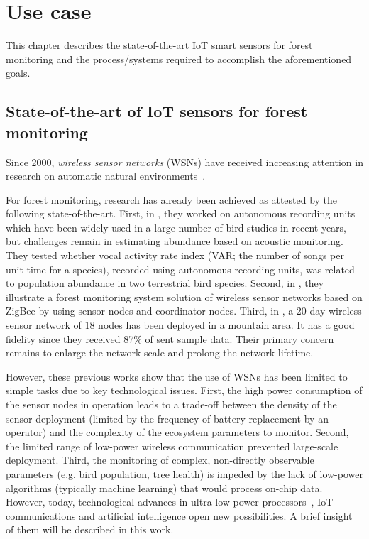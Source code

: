 \documentclass{EPL-master-thesis-covers-EN}
\begin{document}
\chapter{Use case}

This chapter describes the state-of-the-art IoT smart sensors for forest monitoring and the process/systems required to accomplish the aforementioned goals.

\section{State-of-the-art of IoT sensors for forest monitoring}

Since 2000, \textit{wireless sensor networks} (WSNs) have received increasing attention in research on automatic natural environments~\cite{Akyildiz}. 

For forest monitoring, research has already been achieved as attested by the following state-of-the-art. First, in \cite{Granados}, they worked on autonomous recording units which have been widely used in a large number of bird studies in recent years, but challenges remain in estimating abundance based on acoustic monitoring. They tested whether vocal activity rate index (VAR; the number of songs per unit time for a species), recorded using autonomous recording units, was related to population abundance in two terrestrial bird species. Second, in \cite{Huanqi}, they illustrate a forest monitoring system solution of wireless sensor networks based on ZigBee by using sensor nodes and coordinator nodes. Third, in \cite{Jiang}, a 20-day wireless sensor network of 18 nodes has been deployed in a mountain area. It has a good fidelity since they received 87\% of sent sample data. Their primary concern remains to enlarge the network scale and prolong the network lifetime.

However, these previous works show that the use of WSNs has been limited to simple tasks due to key technological issues. First, the high power consumption of the sensor nodes in operation leads to a trade-off between the density of the sensor deployment (limited by the frequency of battery replacement by an operator) and the complexity of the ecosystem parameters to monitor. Second, the limited range of low-power wireless communication prevented large-scale deployment. Third, the monitoring of complex, non-directly observable parameters (e.g. bird population, tree health) is impeded by the lack of low-power algorithms (typically machine learning) that would process on-chip data. However, today, technological advances in ultra-low-power processors~\cite{8662293}, IoT communications and artificial intelligence open new possibilities. A brief insight of them will be described in this work.
\end{document}
